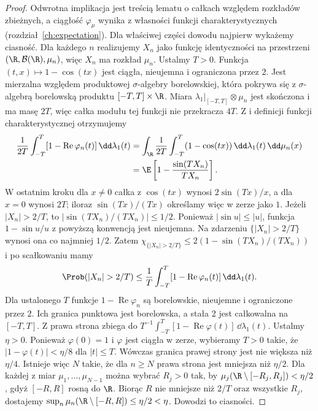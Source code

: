 \begin{proof}
Odwrotna implikacja jest treścią lematu
o całkach względem rozkładów zbieżnych, a ciągłość
$\varphi_\mu$ wynika z własności funkcji charakterystycznych
(rozdział~\ref{ch:expectation}).
Dla właściwej części dowodu najpierw wykażemy ciasność.
Dla każdego $n$ realizujemy $X_n$ jako funkcję
identyczności na przestrzeni $(\R,\mathcal B(\R),\mu_n)$,
więc $X_n$ ma rozkład $\mu_n$. Ustalmy $T>0$.
Funkcja $(t,x)\mapsto1-\cos(tx)$ jest ciągła,
nieujemna i ograniczona przez $2$.
Jest mierzalna względem produktowej $\sigma$-algebry
borelowskiej, która pokrywa się z $\sigma$-algebrą
borelowską produktu $[-T,T]\times\R$.
Miara $\lambda_1|_{[-T,T]}\otimes\mu_n$ jest skończona
i ma masę $2T$, więc całka modułu tej funkcji
nie przekracza $4T$. Z
i definicji funkcji charakterystycznej otrzymujemy
\[
\begin{aligned}
\frac1{2T}\int_{-T}^T[1-\operatorname{Re}\varphi_n(t)]
\,\dd\lambda_1(t)
&=\int_\R\frac1{2T}\int_{-T}^T(1-\cos(tx))
\,\dd\lambda_1(t)\,\dd\mu_n(x)\\
&=\E\left[1-\frac{\sin(TX_n)}{TX_n}\right].
\end{aligned}
\]
W ostatnim kroku dla $x\ne0$ całka z $\cos(tx)$
wynosi $2\sin(Tx)/x$, a dla $x=0$ wynosi $2T$;
iloraz $\sin(Tx)/(Tx)$ określamy więc w zerze jako $1$.
Jeżeli $|X_n|>2/T$, to
$|\sin(TX_n)/(TX_n)|\leq1/2$.
Ponieważ $|\sin u|\leq |u|$, funkcja
$1-\sin u/u$ z powyższą konwencją jest nieujemna.
Na zdarzeniu $\{|X_n|>2/T\}$ wynosi ona co najmniej
$1/2$. Zatem $\chi_{\{|X_n|>2/T\}}\leq
2(1-\sin(TX_n)/(TX_n))$ i po scałkowaniu mamy
\[
\Prob(|X_n|>2/T)\leq\frac1T
\int_{-T}^T[1-\operatorname{Re}\varphi_n(t)]
\,\dd\lambda_1(t).
\]
Dla ustalonego $T$ funkcje $1-\operatorname{Re}\varphi_n$
są borelowskie, nieujemne i ograniczone przez $2$.
Ich granica punktowa jest borelowska, a stała $2$
jest całkowalna na $[-T,T]$. Z
prawa strona zbiega do
$T^{-1}\int_{-T}^T[1-\operatorname{Re}\varphi(t)]\,\dd\lambda_1(t)$.
Ustalmy $\eta>0$. Ponieważ $\varphi(0)=1$
i $\varphi$ jest ciągła w zerze, wybieramy $T>0$ takie,
że $|1-\varphi(t)|<\eta/8$ dla $|t|\leq T$.
Wówczas granica prawej strony jest nie większa niż
$\eta/4$. Istnieje więc $N$ takie, że dla $n\geq N$
prawa strona jest mniejsza niż $\eta/2$.
Dla każdej z miar $\mu_1,\ldots,\mu_{N-1}$ można
wybrać $R_j>0$ tak, by $\mu_j(\R\setminus[-R_j,R_j])<\eta/2$,
gdyż $[-R,R]$ rosną do $\R$.
Biorąc $R$ nie mniejsze niż $2/T$ oraz wszystkie $R_j$,
dostajemy $\sup_n\mu_n(\R\setminus[-R,R])\leq\eta/2<\eta$.
Dowodzi to ciasności.


\end{proof}
